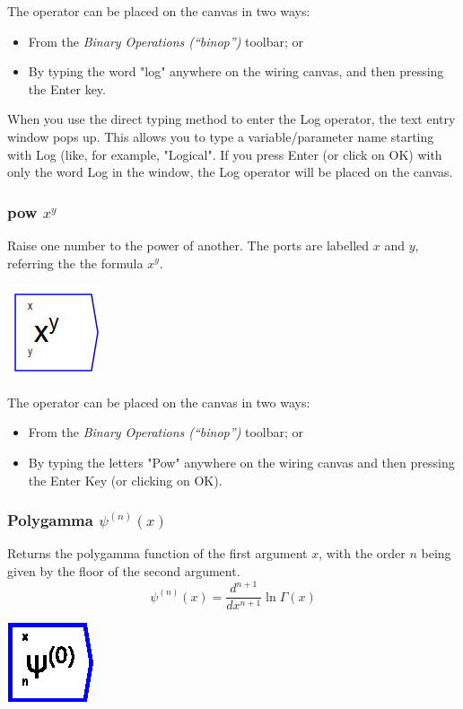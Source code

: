 The operator can be placed on the canvas in two ways:
\begin{itemize}
\item From the \emph{Binary Operations (``binop'')} toolbar; or 
\item By typing the word "log" anywhere on the wiring canvas, and then
pressing the Enter key. 
\end{itemize}
When you use the direct typing method to enter the Log operator, the
text entry window pops up. This allows you to type a variable/parameter
name starting with Log (like, for example, "Logical". If you press
Enter (or click on OK) with only the word Log in the window, the Log
operator will be placed on the canvas.

\subsubsection{pow $x^{y}$}

\label{Operation:pow} Raise one number to the power of another. The
ports are labelled $x$ and $y$, referring the the formula $x^{y}$.

\includegraphics{images/PowerKey}

The operator can be placed on the canvas in two ways:
\begin{itemize}
\item From the \emph{Binary Operations (``binop'')} toolbar; or 
\item By typing the letters "Pow" anywhere on the wiring canvas and then
pressing the Enter Key (or clicking on OK). 
\end{itemize}

\subsubsection{Polygamma $\psi^{(n)}(x)$}

\label{Operation:polygamma} Returns the polygamma function of the
first argument $x$, with the order $n$ being given by the floor
of the second argument. 
\[
\psi^{(n)}(x)=\frac{d^{n+1}}{dx^{n+1}}\ln\Gamma(x)
\]

\includegraphics{images/Polygamma}

